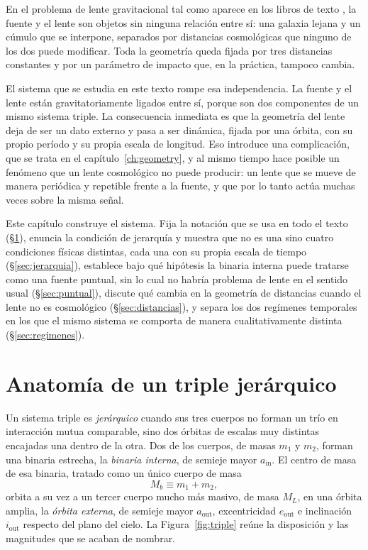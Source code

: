 \documentclass[11pt,a4paper,openany]{book}
\newcommand{\ain}{a_{\mathrm{in}}}
\newcommand{\aout}{a_{\mathrm{out}}}
\begin{document}
En el problema de lente gravitacional tal como aparece en los libros de texto
\citep{SchneiderEhlersFalco1992}, la fuente y el lente son objetos sin
ninguna relaci\'on entre s\'i: una galaxia lejana y un c\'umulo que se
interpone, separados por distancias cosmol\'ogicas que ninguno de los dos
puede modificar. Toda la geometr\'ia queda fijada por tres distancias
constantes y por un par\'ametro de impacto que, en la pr\'actica, tampoco
cambia.

El sistema que se estudia en este texto rompe esa independencia. La fuente y
el lente est\'an gravitatoriamente ligados entre s\'i, porque son dos
componentes de un mismo sistema triple. La consecuencia inmediata es que la
geometr\'ia del lente deja de ser un dato externo y pasa a ser din\'amica,
fijada por una \'orbita, con su propio per\'iodo y su propia escala de
longitud. Eso introduce una complicaci\'on, que se trata en el
cap\'itulo~\ref{ch:geometry}, y al mismo tiempo hace posible un fen\'omeno
que un lente cosmol\'ogico no puede producir: un lente que se mueve de manera
peri\'odica y repetible frente a la fuente, y que por lo tanto act\'ua muchas
veces sobre la misma se\~nal.

Este cap\'itulo construye el sistema. Fija la notaci\'on que se usa en todo el
texto (\S\ref{sec:anatomia}), enuncia la condici\'on de jerarqu\'ia y muestra
que no es una sino cuatro condiciones f\'isicas distintas, cada una con su
propia escala de tiempo (\S\ref{sec:jerarquia}), establece bajo qu\'e
hip\'otesis la binaria interna puede tratarse como una fuente puntual, sin lo
cual no habr\'ia problema de lente en el sentido usual (\S\ref{sec:puntual}),
discute qu\'e cambia en la geometr\'ia de distancias cuando el lente no es
cosmol\'ogico (\S\ref{sec:distancias}), y separa los dos reg\'imenes
temporales en los que el mismo sistema se comporta de manera cualitativamente
distinta (\S\ref{sec:regimenes}).

\section{Anatom\'ia de un triple jer\'arquico}
\label{sec:anatomia}

Un sistema triple es \emph{jer\'arquico} cuando sus tres cuerpos no forman un
tr\'io en interacci\'on mutua comparable, sino dos \'orbitas de escalas muy
distintas encajadas una dentro de la otra. Dos de los cuerpos, de masas $m_1$
y $m_2$, forman una binaria estrecha, la \emph{binaria interna}, de semieje
mayor $\ain$. El centro de masa de esa binaria, tratado como un \'unico cuerpo
de masa
\begin{equation}
  M_b \equiv m_1+m_2 ,
  \label{eq:Mb}
\end{equation}
orbita a su vez a un tercer cuerpo mucho m\'as masivo, de masa $M_L$, en una
\'orbita amplia, la \emph{\'orbita externa}, de semieje mayor $\aout$,
excentricidad $e_\mathrm{out}$ e inclinaci\'on $i_\mathrm{out}$ respecto del
plano del cielo. La Figura~\ref{fig:triple} re\'une la disposici\'on y las
magnitudes que se acaban de nombrar.
\end{document}
